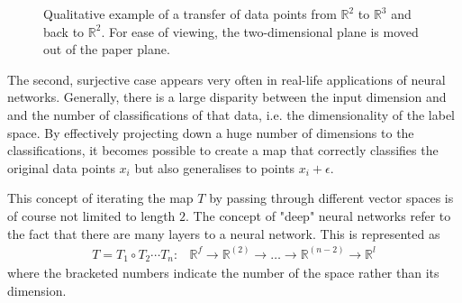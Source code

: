 \documentclass[a4paper, justified]{tufte-handout}
\begin{document}
\begin{figure*}\centering
{}
\caption{Qualitative example of a transfer of data points from $\mathbb{R}^2$ to $\mathbb{R}^3$ and back to $\mathbb{R}^2$. For ease of viewing, the two-dimensional plane is moved out of the paper plane.}\label{fig:transfer}
\end{figure*}

The second, surjective case appears very often in real-life applications of neural networks. Generally, there is a large disparity between the input dimension and and the number of classifications of that data, i.e. the dimensionality of the label space. By effectively projecting down a huge number of dimensions to the classifications, it becomes possible to create a map that correctly classifies the original data points $x_i$ but also generalises to points $x_i + \epsilon$.

This concept of iterating the map $T$ by passing through different vector spaces is of course not limited to length $2$. The concept of "deep" neural networks refer to the fact that there are many layers to a neural network. This is represented as
\begin{align}
T= T_1 \circ T_2 \cdots T_n:& \mathbb{R}^f \to \mathbb{R}^{(2)}\to \ldots \to \mathbb{R}^{(n-2)} \to \mathbb{R}^l
\end{align}
where the bracketed numbers indicate the number of the space rather than its dimension.
\end{document}

